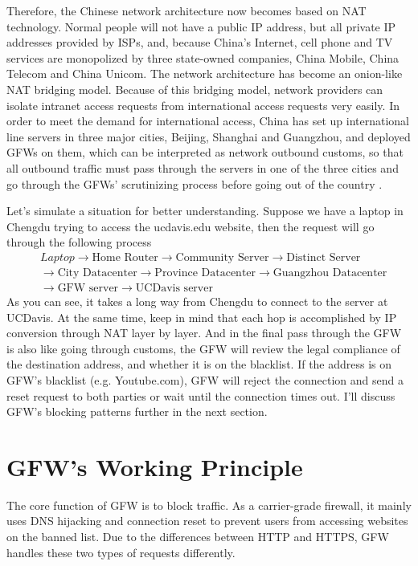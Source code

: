 \documentclass[11pt]{article}
\begin{document}
Therefore, the Chinese network architecture now becomes based on NAT technology.
Normal people will not have a public IP address, but all private IP
addresses provided by ISPs, and, because China's Internet, cell phone and TV
services are monopolized by three state-owned companies, China Mobile, China
Telecom and China Unicom. The network architecture has become an onion-like NAT
bridging model. Because of this bridging model, network providers can isolate
intranet access requests from international access requests very easily. In
order to meet the demand for international access, China has set up
international line servers in three major cities, Beijing, Shanghai and
Guangzhou, and deployed GFWs on them, which can be interpreted as network
outbound customs, so that all outbound traffic must pass through the servers in
one of the three cities and go through the GFWs' scrutinizing process before
going out of the country \cite{GlobalNetServer}.

Let's simulate a situation for better understanding. Suppose we have a laptop in
Chengdu trying to access the ucdavis.edu website, then the request will go
through the following process
\begin{align*}      & Laptop \rightarrow \text{Home Router} \rightarrow
                   \text{Community Server} \rightarrow \text{Distinct Server} \\ &\rightarrow
                   \text{City Datacenter} \rightarrow \text{Province Datacenter} \rightarrow
                   \text{Guangzhou Datacenter}                                \\ &\rightarrow \text{GFW server} \rightarrow
                   \text{UCDavis server}\end{align*}
As you can see, it takes a long way from Chengdu to connect to the server at UCDavis.
At the same time, keep in mind that each hop is accomplished by IP conversion
through NAT layer by layer. And in the final pass through the GFW is also like
going through customs, the GFW will review the legal compliance of the
destination address, and whether it is on the blacklist. If the address is on
GFW's blacklist (e.g. Youtube.com), GFW will reject the connection and send a
reset request to both parties or wait until the connection times out. I'll
discuss GFW's blocking patterns further in the next section.

\section{GFW's Working Principle}
The core function of GFW is to block traffic. As a carrier-grade firewall, it
mainly uses DNS hijacking and connection reset to prevent users from accessing
websites on the banned list. Due to the differences between HTTP and HTTPS, GFW
handles these two types of requests differently.
\end{document}
